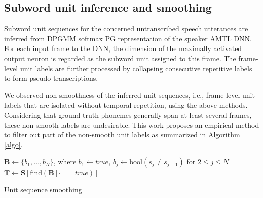 \documentclass[a4paper]{article}
\begin{document}
\subsection{Subword unit inference and  smoothing}
Subword unit sequences for the concerned
untranscribed speech utterances are inferred from DPGMM softmax PG representation of the speaker AMTL DNN.
For each input frame to the DNN, the dimension of the maximally activated output neuron is regarded as the subword unit assigned to this frame.  The frame-level unit labels are further processed by collapsing consecutive repetitive labels to form pseudo transcriptions.

We observed non-smoothness of the inferred unit sequences, i.e.,  frame-level unit labels that are isolated without temporal repetition,  using the above methods. Considering that ground-truth phonemes generally span at least several frames, these non-smooth labels are undesirable. This work proposes an empirical method to filter out part of the non-smooth unit labels as summarized in Algorithm \ref{algo}.

\begin{algorithm}[h]
\SetAlgoLined
 $\bm{B} \leftarrow \{b_1, \ldots ,b_N$\}, where $b_1 \leftarrow \textit{true}$, $b_j \leftarrow \textrm{bool} (s_j\neq s_{j-1})$ for $2\leq j \leq N$\; 
 $\bm{T} \leftarrow \bm{S} [\textrm{find}(\bm{B[\cdot] = \textit{true}})]$\;
 \caption{Unit sequence smoothing}
 \label{algo}
\end{algorithm}

% 
\end{document}
